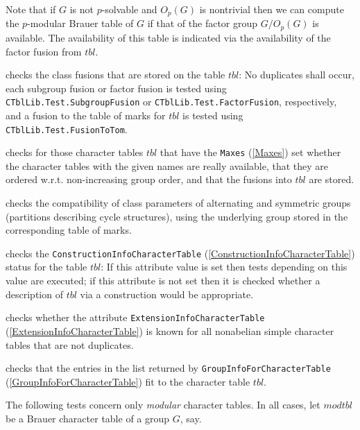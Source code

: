 \documentclass[a4paper,11pt]{report}
\begin{document}
{{\begin{description}
 Note that if $G$ is not $p$-solvable and $O_p(G)$ is nontrivial then we can compute the $p$-modular Brauer table of $G$ if that of the factor group $G/O_p(G)$ is available. The availability of this table is indicated via the availability
of the factor fusion from $tbl$. 
\item[{\texttt{CTblLib.Test.Fusions( }$tbl$\texttt{ )}}]  checks the class fusions that are stored on the table $tbl$: No duplicates shall occur, each subgroup fusion or factor fusion is tested
using \texttt{CTblLib.Test.SubgroupFusion} or \texttt{CTblLib.Test.FactorFusion}, respectively, and a fusion to the table of marks for $tbl$ is tested using \texttt{CTblLib.Test.FusionToTom}. 
\item[{\texttt{CTblLib.Test.Maxes( }$tbl$\texttt{ )}}]  checks for those character tables $tbl$ that have the \texttt{Maxes} (\ref{Maxes}) set whether the character tables with the given names are really available,
that they are ordered w.r.t. non-increasing group order, and that the fusions
into $tbl$ are stored. 
\item[{\texttt{CTblLib.Test.ClassParameters( }$tbl$\texttt{ )}}]  checks the compatibility of class parameters of alternating and symmetric
groups (partitions describing cycle structures), using the underlying group
stored in the corresponding table of marks. 
\item[{\texttt{CTblLib.Test.Constructions( }$tbl$\texttt{ )}}]  checks the \texttt{ConstructionInfoCharacterTable} (\ref{ConstructionInfoCharacterTable}) status for the table $tbl$: If this attribute value is set then tests depending on this value are
executed; if this attribute is not set then it is checked whether a
description of $tbl$ via a construction would be appropriate. 
\item[{\texttt{CTblLib.Test.ExtensionInfo( }$tbl$\texttt{ )}}]  checks whether the attribute \texttt{ExtensionInfoCharacterTable} (\ref{ExtensionInfoCharacterTable}) is known for all nonabelian simple character tables that are not duplicates. 
\item[{\texttt{CTblLib.Test.GroupForGroupInfo( }$tbl$\texttt{ )}}]  checks that the entries in the list returned by \texttt{GroupInfoForCharacterTable} (\ref{GroupInfoForCharacterTable}) fit to the character table $tbl$. 
\end{description}
 

 The following tests concern only \emph{modular} character tables. In all cases, let $modtbl$ be a Brauer character table of a group $G$, say. 

}}
\end{document}
